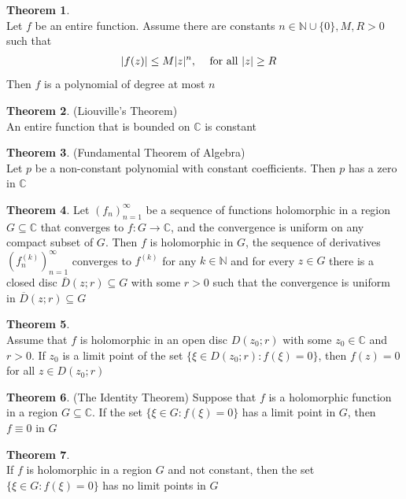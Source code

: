 \documentclass[letterpaper, 11pt]{article}
\newcommand{\C}{\mathbb{C}}   %
\newcommand{\N}{\mathbb{N}}   %
\newcommand{\1}{\mathds{1}}	%
\theoremstyle{definition}
\newtheorem{theorem}{Theorem}[section]
\begin{document}
\begin{theorem} ~\\
Let $f$ be an entire function. Assume there are constants $n \in \N \cup \{0\}, M,R > 0$ such that
\begin{align}
|f(z)| \le M|z|^n, \ & \ \ \text{ for all } |z| \ge R \notag
\end{align}
Then $f$ is a polynomial of degree at most $n$
\end{theorem}

\begin{theorem} (Liouville's Theorem) \\
An entire function that is bounded on $\C$ is constant
\end{theorem}

\newpage

\begin{theorem} (Fundamental Theorem of Algebra) \\
Let $p$ be a non-constant polynomial with constant coefficients. Then $p$ has a zero in $\C$
\end{theorem}

\begin{theorem}
Let $(f_n)_{n=1} ^\infty$ be a sequence of functions holomorphic in a region $G \subseteq \C$ that converges to $f: G \to \C$, and the convergence is uniform on any compact subset of $G$. Then $f$ is holomorphic in $G$, the sequence of derivatives $(f_n ^{(k)})_{n=1} ^ \infty$ converges to $f^{(k)}$ for any $k \in \N$ and for every $z\in G$ there is a closed disc $\overline{D}(z; r) \subseteq G$ with some $r > 0$ such that the convergence is uniform in $\overline{D}(z; r) \subseteq G$
\end{theorem}

\begin{theorem} ~\\
Assume that $f$ is holomorphic in an open disc $D(z_0; r)$ with some $z_0 \in \C$ and $r>0$. If $z_0$ is a limit point of the set $\{\xi \in D(z_0; r) : f(\xi) = 0\}$, then $f(z) = 0$ for all $z \in D(z_0; r)$
\end{theorem}

\begin{theorem} (The Identity Theorem)
Suppose that $f$ is a holomorphic function in a region $G \subseteq \C$. If the set $\{\xi \in G: f(\xi) = 0\}$ has a limit point in $G$, then $f \equiv 0$ in $G$
\end{theorem}

\begin{theorem} ~\\
If $f$ is holomorphic in a region $G$ and not constant, then the set $\{\xi \in G: f(\xi) = 0\}$ has no limit points in $G$
\end{theorem}
\end{document}
